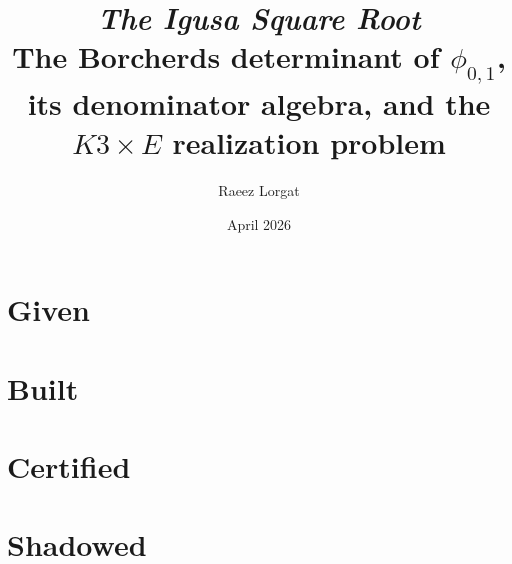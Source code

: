 \documentclass[11pt,oldfontcommands]{memoir}
\title{\texorpdfstring{\textit{The Igusa Square Root}\\[0.5em]\small The Borcherds determinant of \(\phi_{0,1}\), its denominator algebra, and the \(K3\times E\) realization problem}{The Igusa Square Root: The Borcherds determinant of phi\_0,1, its denominator algebra, and the K3 x E realization problem}}
\author{Raeez Lorgat}
\date{April 2026}
\begin{document}
\maketitle



\bigskip
\tableofcontents

\part{Given}






\part{Built}



\part{Certified}



\part{Shadowed}
\end{document}
